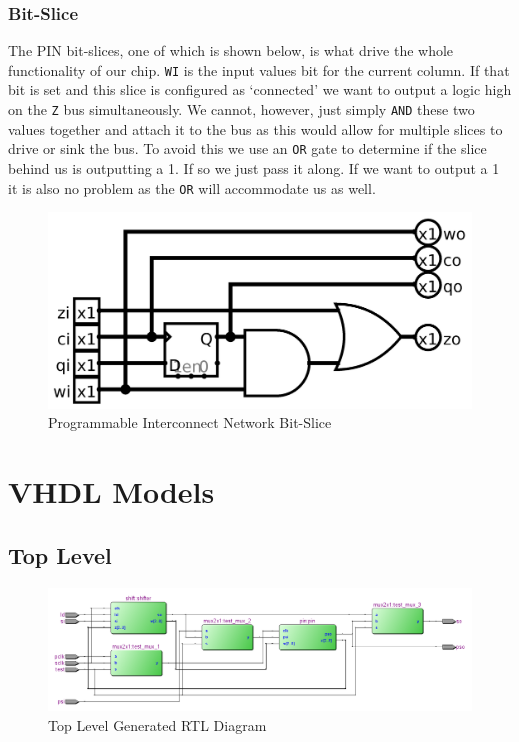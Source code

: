 \documentclass{article}
\begin{document}
        \subsubsection{Bit-Slice}
        The PIN bit-slices, one of which is shown below, is what drive the
        whole functionality of our chip. \texttt{WI} is the input values bit
        for the current column. If that bit is set and this slice is configured
        as `connected' we want to output a logic high on the \texttt{Z} bus
        simultaneously. We cannot, however, just simply \texttt{AND} these two
        values together and attach it to the bus as this would allow for
        multiple slices to drive or sink the bus. To avoid this we use an
        \texttt{OR} gate to determine if the slice behind us is outputting a 1.
        If so we just pass it along.  If we want to output a 1 it is also no
        problem as the \texttt{OR} will accommodate us as well.
        \begin{figure}[H]
            \centering
            \includegraphics[width=0.75\linewidth]{../../logisim/pin_slice.png}
            \caption{Programmable Interconnect Network Bit-Slice}
        \end{figure}


\section{VHDL Models}
    \subsection{Top Level}
        
        \begin{figure}[H]
            \centering
            \includegraphics[width=\linewidth]{../../doc/rtl_pics/top_rtl.png}
            \caption{Top Level Generated RTL Diagram}
        \end{figure}
\end{document}
